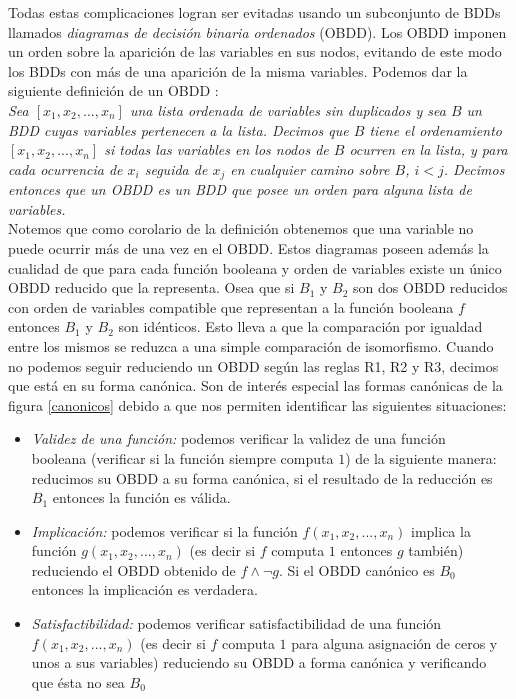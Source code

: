 \documentclass[titlepage, 12pt]{book}
\begin{document}
Todas estas complicaciones logran ser evitadas usando un subconjunto de BDDs llamados \textit{diagramas de decisi\'on binaria ordenados} (OBDD). Los OBDD imponen un orden sobre la aparici\'on de las variables en sus nodos, evitando de este modo los BDDs con m\'as de una aparici\'on de la misma variables. Podemos dar la siguiente definici\'on de un OBDD \cite{Huth}:\\

\textit{Sea $[x_1,x_2,...,x_n]$ una lista ordenada de variables sin duplicados y sea $B$ un BDD cuyas variables pertenecen a la lista. Decimos que $B$ tiene el ordenamiento $[x_1,x_2,...,x_n]$ si todas las variables en los nodos de $B$ ocurren en la lista, y para cada ocurrencia de $x_i$ seguida de $x_j$ en cualquier camino sobre $B$, $i < j$. Decimos entonces que un OBDD es un BDD que posee un orden para alguna lista de variables.}\\

Notemos que como corolario de la definici\'on obtenemos que una variable no puede ocurrir m\'as de una vez en el OBDD. Estos diagramas poseen adem\'as la cualidad de que para cada funci\'on booleana y orden de variables existe un \'unico OBDD reducido que la representa. Osea que si $B_1$ y $B_2$ son dos OBDD reducidos con orden de variables compatible que representan a la funci\'on booleana $f$ entonces $B_1$ y $B_2$ son id\'enticos. Esto lleva a que la comparaci\'on por igualdad entre los mismos se reduzca a una simple comparaci\'on de isomorfismo. Cuando no podemos seguir reduciendo un OBDD seg\'un las reglas R1, R2 y R3, decimos que est\'a en su forma can\'onica. Son de inter\'es especial las formas can\'onicas de la figura \ref{canonicos} debido a que nos permiten identificar las siguientes situaciones:

\begin{itemize}
\item \textit{Validez de una funci\'on:} podemos verificar la validez de una funci\'on\\ booleana (verificar si la funci\'on siempre computa $1$) de la siguiente manera: reducimos su OBDD a su forma can\'onica, si el resultado de la reducci\'on es $B_1$ entonces la funci\'on es v\'alida.
\item \textit{Implicaci\'on:} podemos verificar si la funci\'on $f(x_1,x_2,...,x_n)$ implica la funci\'on $g(x_1,x_2,...,x_n)$ (es decir si $f$ computa $1$ entonces $g$ tambi\'en) reduciendo el OBDD obtenido de $f \wedge \neg g$. Si el OBDD can\'onico es $B_0$ entonces la implicaci\'on es verdadera.
\item \textit{Satisfactibilidad:} podemos verificar satisfactibilidad de una funci\'on\\ $f(x_1,x_2,...,x_n)$ (es decir si $f$ computa $1$ para alguna asignaci\'on de ceros y unos a sus variables) reduciendo su OBDD a forma can\'onica y verificando que \'esta no sea $B_0$
\end{itemize}
\end{document}
